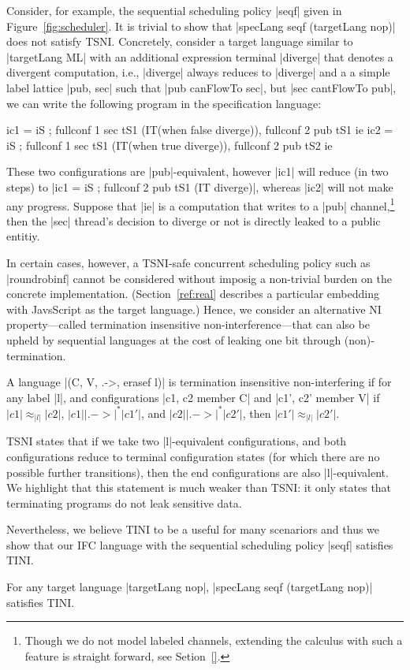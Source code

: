 Consider, for example, the sequential scheduling policy |seqf| given in
Figure~\ref{fig:scheduler}.
%
It is trivial to show that |specLang seqf (targetLang nop)| does not satisfy
TSNI.
%
Concretely, consider a target language similar to |targetLang ML| with an
additional expression terminal |diverge| that denotes a divergent computation,
i.e., |diverge| always reduces to |diverge| and a a simple label lattice |{pub,
sec}| such that |pub canFlowTo sec|, but |sec cantFlowTo pub|, we can write the
following program in the specification language:
\begin{code}
ic1 = iS ; fullconf 1 sec tS1 (IT(when false diverge)),  fullconf 2 pub tS1 ie
ic2 = iS ; fullconf 1 sec tS1 (IT(when true diverge)),   fullconf 2 pub tS2 ie
\end{code}
These two configurations are |pub|-equivalent, however |ic1| will reduce (in two
steps) to |ic1 = iS ; fullconf 2 pub tS1 (IT diverge)|, whereas |ic2| will not make
any progress.
%
Suppose that |ie| is a computation that writes to a |pub| channel,\footnote{
Though we do not model labeled channels, extending the calculus with such a
feature is straight forward, see Setion~\ref{}.
} then the |sec| thread's decision to diverge or not is directly leaked to a
public entitiy.

In certain cases, however, a TSNI-safe concurrent scheduling policy such as
|roundrobinf| cannot be considered without imposig a non-trivial burden on the
concrete implementation.
%
(Section~\ref{ref:real} describes a particular embedding with JavsScript as the
target language.)
%
Hence, we consider an alternative NI property---called termination insensitive
non-interference---that can also be upheld by sequential languages at the cost
of leaking one bit through (non)-termination.
%
\begin{definition}
  A language |(C, V, .->, erasef l)| is termination
  insensitive non-interfering if for any label |l|, and configurations
  |c1, c2 member C| and |c1', c2' member V| if
   $|c1| \approx_{|l|} |c2|$,
   $|c1| |.->|^* |c1'|$, and
   $|c2| |.->|^* |c2'|$, then
   $|c1'| \approx_{|l|} |c2'|$.
\end{definition}

TSNI states that if we take two |l|-equivalent configurations, and both
configurations reduce to terminal configuration states (for which there are no
possible further transitions), then the end configurations are also
|l|-equivalent.
%
We highlight that this statement is much weaker than TSNI: it only states that
terminating programs do not leak sensitive data.
 
Nevertheless, we believe TINI to be a useful for many scenariors and thus we
show that our IFC language with the sequential scheduling policy |seqf|
satisfies TINI.
%
\begin{theorem}
  \label{thm:seq-tini}
For any target language |targetLang nop|, |specLang seqf (targetLang
nop)| satisfies TINI.
\end{theorem}
